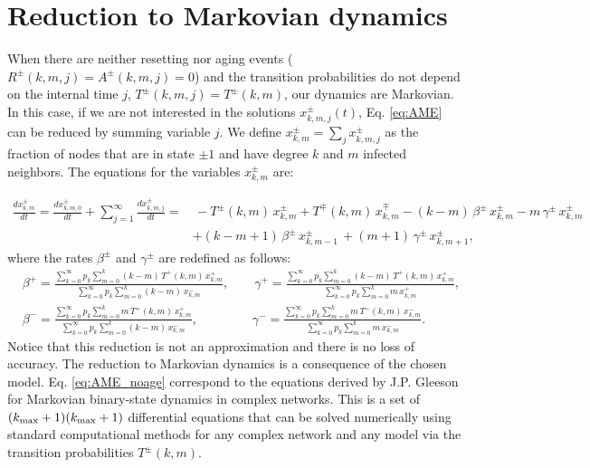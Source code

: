 \section{\label{sec:Reduction to Markovian dynamics}  Reduction to Markovian dynamics}

When there are neither resetting nor aging events ($R^{\pm} (k,m,j) = A^{\pm} (k,m,j) = 0$) and the transition probabilities do not depend on the internal time $j$, $T^{\pm} (k,m,j) = T^{\pm} (k,m)$, our dynamics are Markovian. In this case, if we are not interested in the solutions $x^{\pm}_{k,m,j} (t)$, Eq. \ref{eq:AME} can be reduced by summing variable $j$. We define $x^{\pm}_{k,m} = \sum_{j} x^{\pm}_{k,m,j}$ as the fraction of nodes that are in state $\pm 1$ and have degree $k$ and $m$ infected neighbors. The equations for the variables $x^{\pm}_{k,m}$ are:

\begin{align}
\label{eq:AME_noage}
    \frac{d x^{\pm}_{k,m}}{dt} = \frac{d x^{\pm}_{k,m,0}}{dt} + \sum _{j=1}^{\infty} \frac{d x^{\pm}_{k,m,j}}{dt}  = & \, - T^{\pm} (k,m) \, x^{\pm}_{k,m} + T^{\mp}(k,m) \, x^{\mp}_{k,m} - (k - m)\, \beta^{\pm} \,  x^{\pm}_{k,m} - m\, \gamma^{\pm} \,  x^{\pm}_{k,m} \nonumber\\
    & + (k-m+1)\, \beta^{\pm} \,  x^{\pm}_{k,m-1} \, + (m+1)\, \gamma^{\pm} \,  x^{\pm}_{k,m+1},
\end{align}
where the rates $\beta^{\pm}$ and $\gamma^{\pm}$ are redefined as follows:
\begin{align}
    & \beta^{+} = \frac{\sum_{k=0}^{\infty} p_k \sum_{m = 0}^{k} (k - m)\, T^{+} (k,m) \, x^{+}_{k,m}}{\sum_{k=0}^{\infty} p_k \sum_{m = 0}^{k} (k - m)\,  x^{-}_{k,m}}, \quad \quad \gamma^{+} = \frac{\sum_{k=0}^{\infty} p_k \sum_{m = 0}^{k} (k-m)\, T^{+} (k,m) \, x^{+}_{k,m}}{\sum_{k=0}^{\infty} p_k \sum_{m = 0}^{k} m\,  x^{+}_{k,m}}, \nonumber\\
    & \beta^{-} = \frac{\sum_{k=0}^{\infty} p_k \sum_{m = 0}^{k} m \, T^{+} (k,m) \, x^{+}_{k,m}}{\sum_{k=0}^{\infty} p_k \sum_{m = 0}^{k} (k - m)\,  x^{-}_{k,m}}, \quad \quad \quad \quad \; \gamma^{-} = \frac{\sum_{k=0}^{\infty} p_k \sum_{m = 0}^{k} m\, T^{-} (k,m) \, x^{-}_{k,m}}{\sum_{k=0}^{\infty} p_k \sum_{m = 0}^{k} m\,  x^{-}_{k,m}}.
\end{align}
Notice that this reduction is not an approximation and there is no loss of accuracy. The reduction to Markovian dynamics is a consequence of the chosen model. Eq. \ref{eq:AME_noage} correspond to the equations derived by J.P. Gleeson \cite{gleeson-2013} for Markovian binary-state dynamics in complex networks. This is a set of $(k_{\rm max}+1)(k_{\rm max}+1)$ differential equations that can be solved numerically using standard computational methods for any complex network and any model via the transition probabilities $T^{\pm} (k,m)$.

